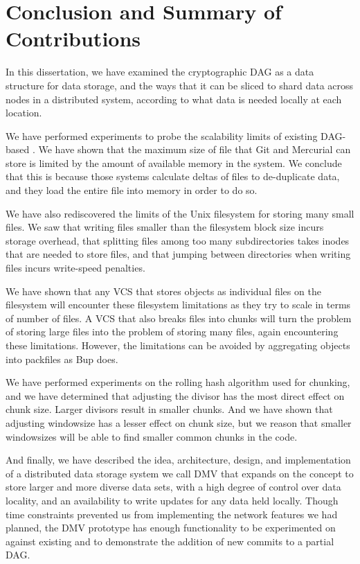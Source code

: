 \chapter{Conclusion and Summary of Contributions}


In this dissertation, we have examined the cryptographic \acrfull{DAG} as a data
structure for data storage, and the ways that it can be sliced to shard data
across nodes in a distributed system, according to what data is needed locally
at each location.

We have performed experiments to probe the scalability limits of existing
\gls{DAG}-based . We have shown that the maximum size of file
that Git and Mercurial can store is limited by the amount of available memory in
the system. We conclude that this is because those systems calculate deltas of
files to de-duplicate data, and they load the entire file into memory in order
to do so.

We have also rediscovered the limits of the Unix filesystem for storing many
small files. We saw that writing files smaller than the filesystem block size
incurs storage overhead, that splitting files among too many subdirectories
takes \glspl{inode} that are needed to store files, and that jumping between
directories when writing files incurs write-speed penalties.

We have shown that any \gls{VCS} that stores objects as individual files on the
filesystem will encounter these filesystem limitations as they try to scale in
terms of number of files. A \gls{VCS} that also breaks files into chunks will
turn the problem of storing large files into the problem of storing many files,
again encountering these limitations. However, the limitations can be avoided by
aggregating objects into \glspl{packfile} as Bup does.

We have performed experiments on the rolling hash algorithm used for chunking,
and we have determined that adjusting the \gls{divisor} has the most direct
effect on chunk size. Larger \glspl{divisor} result in smaller chunks. And we
have shown that adjusting \gls{windowsize} has a lesser effect on chunk size,
but we reason that smaller \glspl{windowsize} will be able to find smaller
common chunks in the code.

And finally, we have described the idea, architecture, design, and
implementation of a distributed data storage system we call \gls{DMV} that
expands on the  concept to store
larger and more diverse data sets, with a high degree of control over data
locality, and an availability to write updates for any data held locally. Though
time constraints prevented us from implementing the network features we had
planned, the \gls{DMV} prototype has enough functionality to be experimented on
against existing  and to demonstrate the addition of new
\glspl{commit} to a partial \gls{DAG}.
